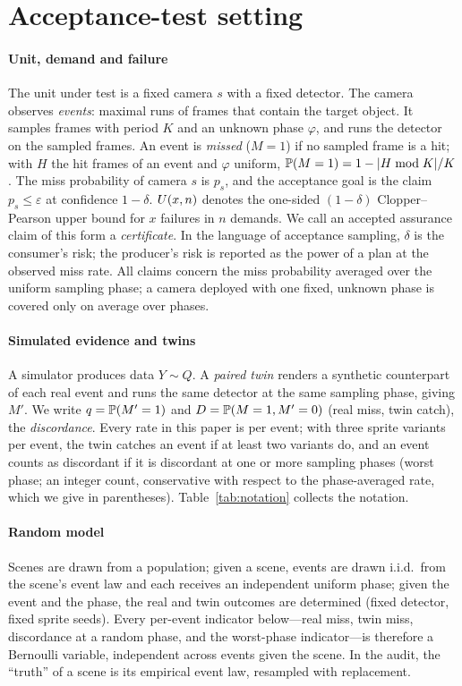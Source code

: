 \section{Acceptance-test setting}\label{sec:demo}

\paragraph{Unit, demand and failure} The unit under test is a fixed camera $s$ with a fixed detector. The camera observes
\emph{events}: maximal runs of frames that contain the target object. It samples frames with period $K$ and an unknown
phase $\varphi$, and runs the detector on the sampled frames. An event is \emph{missed} ($M=1$) if no sampled frame is a
hit; with $H$ the hit frames of an event and $\varphi$ uniform, $\mathbb{P}(M=1)=1-|H\bmod K|/K$. The miss probability of camera
$s$ is $p_s$, and the acceptance goal is the claim $p_s\le\varepsilon$ at confidence $1-\delta$.
$U(x,n)$ denotes the one-sided $(1-\delta)$ Clopper--Pearson upper bound for $x$ failures in $n$ demands. We call an accepted assurance claim of this form a \emph{certificate}. In the language of acceptance sampling,
$\delta$ is the consumer's risk; the producer's risk is reported as the power of a plan at the observed miss rate.
All claims concern the miss probability averaged over the uniform sampling phase; a camera deployed with one fixed,
unknown phase is covered only on average over phases.

\paragraph{Simulated evidence and twins} A simulator produces data $Y\sim Q$. A \emph{paired twin} renders a synthetic
counterpart of each real event and runs the same detector at the same sampling phase, giving $M'$. We write
$q=\mathbb{P}(M'=1)$ and $D=\mathbb{P}(M=1,M'=0)$ (real miss, twin catch), the \emph{discordance}. Every rate in this paper is per
event; with three sprite variants per event, the twin catches an event if at least two variants do, and an event counts
as discordant if it is discordant at one or more sampling phases (worst phase; an integer count, conservative with
respect to the phase-averaged rate, which we give in parentheses). Table~\ref{tab:notation} collects the notation.

\paragraph{Random model} Scenes are drawn from a population; given a scene, events are drawn i.i.d.\ from the scene's
event law and each receives an independent uniform phase; given the event and the phase, the real and twin outcomes are
determined (fixed detector, fixed sprite seeds). Every per-event indicator below---real miss, twin miss, discordance at a
random phase, and the worst-phase indicator---is therefore a Bernoulli variable, independent across events given the
scene. In the audit, the ``truth'' of a scene is its empirical event law, resampled with replacement.

